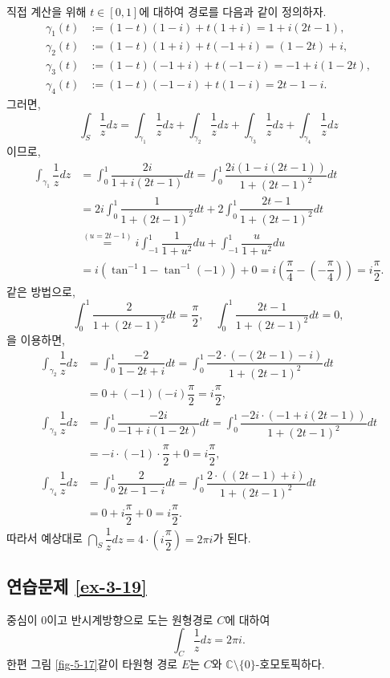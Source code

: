 직접 계산을 위해 $t\in[0,1]$에 대하여 경로를 다음과 같이 정의하자.
\begin{align*}
\gamma_1(t) &:= (1-t)(1-i) + t(1+i) = 1 + i(2t-1), \\
\gamma_2(t) &:= (1-t)(1+i) + t(-1+i) = (1-2t) + i, \\
\gamma_3(t) &:= (1-t)(-1+i) + t(-1-i) = -1 + i(1-2t), \\
\gamma_4(t) &:= (1-t)(-1-i) + t(1-i) = 2t-1 -i.
\end{align*}
그러면,
\[
\int_S \dfrac1z dz = \int_{\gamma_1} \dfrac1z dz
+ \int_{\gamma_2} \dfrac1z dz + \int_{\gamma_3} \dfrac1z dz + \int_{\gamma_4} \dfrac1z dz
\]
이므로,
\begin{align*}
\int_{\gamma_1} \dfrac1z dz
&= \int_0^1 \dfrac{2i}{1+i(2t-1)}dt = \int_0^1 \dfrac{2i(1-i(2t-1))}{1+(2t-1)^2}dt \\
&= 2i\int_0^1\dfrac1{1+(2t-1)^2}dt + 2\int_0^1 \dfrac{2t-1}{1+(2t-1)^2}dt \\
&\stackrel{(u=2t-1)}{=} i \int_{-1}^1 \dfrac1{1+u^2}du  + \int_{-1}^1 \dfrac u{1+u^2}du \\
&= i(\tan^{-1}1 - \tan^{-1}(-1)) + 0 
= i\left(\dfrac\pi4 - \left(-\dfrac\pi4\right)\right) = i \dfrac\pi2.
\end{align*}
같은 방법으로, 
\[
\int_0^1 \dfrac2{1+(2t-1)^2}dt = \dfrac\pi2, \quad
\int_0^1 \dfrac{2t-1}{1+(2t-1)^2}dt = 0,
\]
을 이용하면,
\begin{align*}
\int_{\gamma_2} \dfrac1z dz
&= \int_0^1 \dfrac{-2}{1-2t+i}dt = \int_0^1 \dfrac{-2\cdot(-(2t-1)-i)}{1+(2t-1)^2}dt \\
&= 0 + (-1)(-i)\dfrac\pi2 = i\dfrac\pi2, \\
\int_{\gamma_3} \dfrac1z dz
&= \int_0^1 \dfrac{-2i}{-1+i(1-2t)}dt = \int_0^1 \dfrac{-2i\cdot(-1+i(2t-1))}{1+(2t-1)^2}dt \\
&= -i\cdot(-1)\cdot\dfrac\pi2 +0 = i\dfrac\pi2, \\
\int_{\gamma_4} \dfrac1z dz
&= \int_0^1 \dfrac{2}{2t-1-i}dt = \int_0^1 \dfrac{2\cdot((2t-1)+i)}{1+(2t-1)^2}dt \\
&= 0 + i\dfrac\pi2 +0 = i\dfrac\pi2.
\end{align*}
따라서 예상대로 $\dint_S \dfrac1z dz = 4\cdot\left(i\dfrac\pi2\right) = 2\pi i$가 된다.

\subsection*{연습문제 \ref{ex-3-19}}

중심이 $0$이고 반시계방향으로 도는 원형경로 $C$에 대하여
\[
\int_C \dfrac 1z dz = 2\pi i.
\]
한편 그림 \ref{fig-5-17}\과 같이 타원형 경로 $E$는 $C$와 
$\mathbb C\setminus \{0\}$-호모토픽하다.

